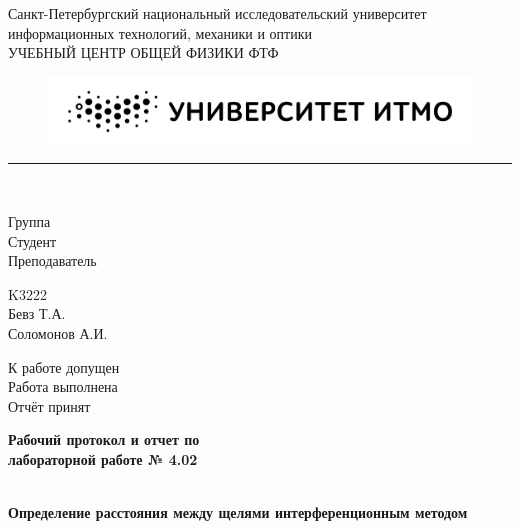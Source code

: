 \documentclass{article}
\begin{document}
\begin{minipage}{0.62\textwidth}
    \begin{center}
        Санкт-Петербургский национальный исследовательский университет \\
        информационных технологий, механики и оптики \\
        УЧЕБНЫЙ ЦЕНТР ОБЩЕЙ ФИЗИКИ ФТФ
    \end{center}
\end{minipage}
\hfill
\begin{minipage}{0.38\textwidth}
    \centering
    \begin{figure}[H]
    \includegraphics[width=\textwidth]{logo.png}
    \end{figure}
\end{minipage}

\rule{\textwidth}{1pt} \\

\begin{minipage}{0.16\textwidth}
        Группа \hrulefill\\
        Студент \hrulefill\\
        Преподаватель \hrulefill
\end{minipage}%
\begin{minipage}{0.25\textwidth}
        K3222\hrulefill\\
        Бевз Т.А.\hrulefill\\
        Соломонов А.И.\hrulefill
\end{minipage}
\hfill
\begin{minipage}{0.47\textwidth}
        К работе допущен \hrulefill\\
        Работа выполнена \hrulefill\\
        Отчёт принят \hrulefill
\end{minipage}
\begin{center}
    \textbf{\huge Рабочий протокол и отчет по \\
    лабораторной работе № 4.02}
\end{center}
\begin{minipage}{1\textwidth}
        \hrulefill\\
        \Large\textbf{Определение расстояния между щелями интерференционным методом}\hrulefill
\end{minipage}
\end{document}
